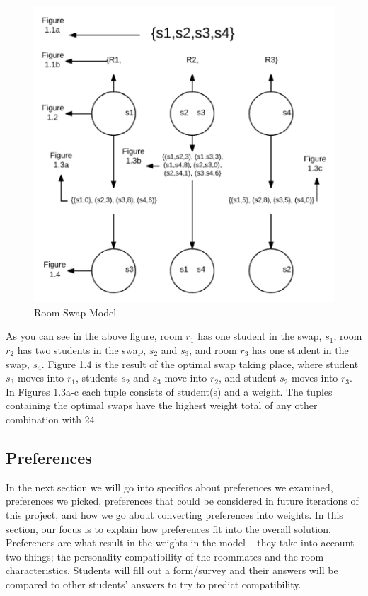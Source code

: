 \documentclass[12pt]{article}
\begin{document}
\begin{multicols}{2}
\begin{figure}[H]
\centering
\includegraphics[scale=0.6]{model} 
\caption{Room Swap Model}
\end{figure}
\noindent As you can see in the above figure, room $r_1$ has one student in the swap, $s_1$, room $r_2$ has two students in the swap, $s_2$ and $s_3$, and room $r_3$ has one student in the swap, $s_4$. Figure 1.4 is the result of the optimal swap taking place, where student $s_3$ moves into $r_1$, students $s_2$ and $s_3$ move into $r_2$, and student $s_2$ moves into $r_3$. In Figures 1.3a-c each tuple consists of student(s) and a weight. The tuples containing the optimal swaps have the highest weight total of any other combination with 24.

\subsection{Preferences}
In the next section we will go into specifics about preferences we examined, preferences we picked, preferences that could be considered in future iterations of this project, and how we go about converting preferences into weights. In this section, our focus is to explain how preferences fit into the overall solution.\\

\noindent Preferences are what result in the weights in the model – they take into account two things; the personality compatibility of the roommates and the room characteristics. Students will fill out a form/survey and their answers will be compared to other students’ answers to try to predict compatibility. 


\end{multicols}
\end{document}
